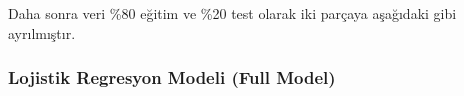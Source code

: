 \documentclass[12pt,twoside]{deuthesis}
\newenvironment{Shaded}{\begin{snugshade}}{\end{snugshade}}
\newcommand{\DataTypeTok}[1]{\textcolor[rgb]{0.13,0.29,0.53}{#1}}
\newcommand{\DecValTok}[1]{\textcolor[rgb]{0.00,0.00,0.81}{#1}}
\newcommand{\FloatTok}[1]{\textcolor[rgb]{0.00,0.00,0.81}{#1}}
\newcommand{\KeywordTok}[1]{\textcolor[rgb]{0.13,0.29,0.53}{\textbf{#1}}}
\newcommand{\NormalTok}[1]{#1}
\newcommand{\OperatorTok}[1]{\textcolor[rgb]{0.81,0.36,0.00}{\textbf{#1}}}
\begin{document}
Daha sonra veri \%80 eğitim ve \%20 test olarak iki parçaya aşağıdaki gibi ayrılmıştır.
\begin{Shaded}
\end{Shaded}
\hypertarget{lojistik-regresyon-modeli-full-model}{%
\subsubsection{Lojistik Regresyon Modeli (Full Model)}\label{lojistik-regresyon-modeli-full-model}}
\end{document}
